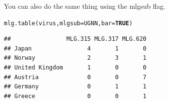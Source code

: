 \documentclass[letterpaper]{article}\usepackage[]{graphicx}\usepackage[]{color}
\makeatletter
\newcommand{\hlnum}[1]{\textcolor[rgb]{0.502,0,0.502}{\textbf{#1}}}%
\newcommand{\hlstd}[1]{\textcolor[rgb]{0,0,0}{#1}}%
\newcommand{\hlkwc}[1]{\textcolor[rgb]{0,0.502,0.753}{#1}}%
\newcommand{\hlkwd}[1]{\textcolor[rgb]{0,0.267,0.4}{#1}}%
\newenvironment{kframe}{%
 \def\at@end@of@kframe{}%
 \ifinner\ifhmode%
  \def\at@end@of@kframe{\end{minipage}}%
  \begin{minipage}{\columnwidth}%
 \fi\fi%
 \def\FrameCommand##1{\hskip\@totalleftmargin \hskip-\fboxsep
 \colorbox{shadecolor}{##1}\hskip-\fboxsep
     \hskip-\linewidth \hskip-\@totalleftmargin \hskip\columnwidth}%
 \MakeFramed {\advance\hsize-\width
   \@totalleftmargin\z@ \linewidth\hsize
   \@setminipage}}%
 {\par\unskip\endMakeFramed%
 \at@end@of@kframe}
\newenvironment{knitrout}{}{} %
\makeatother
\begin{document}
You can also do the same thing using the mlgsub flag.
\begin{knitrout}\footnotesize
{}\color{fgcolor}\begin{kframe}
\begin{alltt}
\hlkwd{mlg.table}\hlstd{(virus,} \hlkwc{mlgsub} \hlstd{= UGNN,} \hlkwc{bar} \hlstd{=} \hlnum{TRUE}\hlstd{)}
\end{alltt}
\end{kframe}
\end{knitrout}

\begin{knitrout}\footnotesize
{}\color{fgcolor}\begin{kframe}
\begin{verbatim}
##                MLG.315 MLG.317 MLG.620
## Japan                4       1       0
## Norway               2       3       1
## United Kingdom       1       0       0
## Austria              0       0       7
## Germany              0       1       1
## Greece               0       0       1
\end{verbatim}
\end{kframe}
\end{knitrout}
\end{document}
